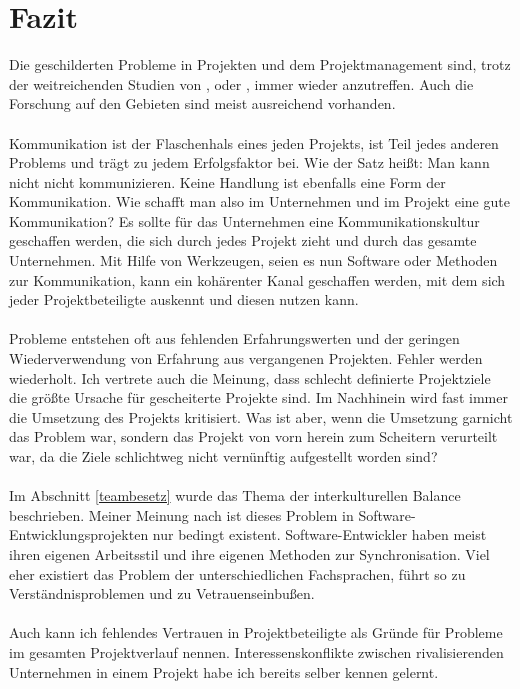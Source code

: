 \documentclass[12pt]{scrartcl}
\begin{document}
\section{Fazit}
Die geschilderten Probleme in Projekten und dem Projektmanagement sind, trotz der weitreichenden Studien von \cite{euregio__studie_erfolgsfaktoren}, \cite{gpm_gesamt_07_09} oder \cite{GPM_Studie_2008}, immer wieder anzutreffen. Auch die Forschung auf den Gebieten sind meist ausreichend vorhanden.\\ 
\\
Kommunikation ist der Flaschenhals eines jeden Projekts, ist Teil jedes anderen Problems und trägt zu jedem Erfolgsfaktor bei. Wie der Satz heißt: Man kann nicht nicht kommunizieren. Keine Handlung ist ebenfalls eine Form der Kommunikation. Wie schafft man also im Unternehmen und im Projekt eine gute Kommunikation? Es sollte für das Unternehmen eine Kommunikationskultur geschaffen werden, die sich durch jedes Projekt zieht und durch das gesamte Unternehmen. Mit Hilfe von Werkzeugen, seien es nun Software oder Methoden zur Kommunikation, kann ein kohärenter Kanal geschaffen werden, mit dem sich jeder Projektbeteiligte auskennt und diesen nutzen kann.\\
\\
Probleme entstehen oft aus fehlenden Erfahrungswerten und der geringen Wiederverwendung von Erfahrung aus vergangenen Projekten. Fehler werden wiederholt. Ich vertrete auch die Meinung, dass schlecht definierte Projektziele die größte Ursache für gescheiterte Projekte sind. Im Nachhinein wird fast immer die Umsetzung des Projekts kritisiert. Was ist aber, wenn die Umsetzung garnicht das Problem war, sondern das Projekt von vorn herein zum Scheitern verurteilt war, da die Ziele schlichtweg nicht vernünftig aufgestellt worden sind?\\
\\
Im Abschnitt \ref{teambesetz} wurde das Thema der interkulturellen Balance beschrieben. Meiner Meinung nach ist dieses Problem in Software-Entwicklungsprojekten nur bedingt existent. Software-Entwickler haben meist ihren eigenen Arbeitsstil und ihre eigenen Methoden zur Synchronisation. Viel eher existiert das Problem der unterschiedlichen Fachsprachen, führt so zu Verständnisproblemen und zu Vetrauenseinbußen.\\
\\
Auch kann ich fehlendes Vertrauen in Projektbeteiligte als Gründe für Probleme im gesamten Projektverlauf nennen. Interessenskonflikte zwischen rivalisierenden Unternehmen in einem Projekt habe ich bereits selber kennen gelernt.\\
\end{document}
